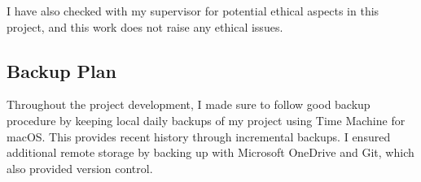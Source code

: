I have also checked with my supervisor for potential ethical aspects in this project, and this work does not raise any ethical issues.

\subsection{Backup Plan}	
Throughout the project development, I made sure to follow good backup procedure by keeping local daily backups of my project using Time Machine for macOS. This provides recent history through incremental backups. I ensured additional remote storage by backing up with Microsoft OneDrive and Git, which also provided version control.